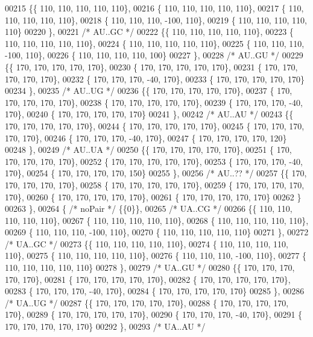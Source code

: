 \begin{DoxyCode}
00215 \{\{ 110, 110, 110, 110, 110\},
00216 \{ 110, 110, 110, 110, 110\},
00217 \{ 110, 110, 110, 110, 110\},
00218 \{ 110, 110, 110, -100, 110\},
00219 \{ 110, 110, 110, 110, 110\}
00220 \},
00221 \textcolor{comment}{/* AU..GC */}
00222 \{\{ 110, 110, 110, 110, 110\},
00223 \{ 110, 110, 110, 110, 110\},
00224 \{ 110, 110, 110, 110, 110\},
00225 \{ 110, 110, 110, -100, 110\},
00226 \{ 110, 110, 110, 110, 100\}
00227 \},
00228 \textcolor{comment}{/* AU..GU */}
00229 \{\{ 170, 170, 170, 170, 170\},
00230 \{ 170, 170, 170, 170, 170\},
00231 \{ 170, 170, 170, 170, 170\},
00232 \{ 170, 170, 170, -40, 170\},
00233 \{ 170, 170, 170, 170, 170\}
00234 \},
00235 \textcolor{comment}{/* AU..UG */}
00236 \{\{ 170, 170, 170, 170, 170\},
00237 \{ 170, 170, 170, 170, 170\},
00238 \{ 170, 170, 170, 170, 170\},
00239 \{ 170, 170, 170, -40, 170\},
00240 \{ 170, 170, 170, 170, 170\}
00241 \},
00242 \textcolor{comment}{/* AU..AU */}
00243 \{\{ 170, 170, 170, 170, 170\},
00244 \{ 170, 170, 170, 170, 170\},
00245 \{ 170, 170, 170, 170, 170\},
00246 \{ 170, 170, 170, -40, 170\},
00247 \{ 170, 170, 170, 170, 120\}
00248 \},
00249 \textcolor{comment}{/* AU..UA */}
00250 \{\{ 170, 170, 170, 170, 170\},
00251 \{ 170, 170, 170, 170, 170\},
00252 \{ 170, 170, 170, 170, 170\},
00253 \{ 170, 170, 170, -40, 170\},
00254 \{ 170, 170, 170, 170, 150\}
00255 \},
00256 \textcolor{comment}{/* AU..?? */}
00257 \{\{ 170, 170, 170, 170, 170\},
00258 \{ 170, 170, 170, 170, 170\},
00259 \{ 170, 170, 170, 170, 170\},
00260 \{ 170, 170, 170, 170, 170\},
00261 \{ 170, 170, 170, 170, 170\}
00262 \}
00263 \},
00264 \{ \textcolor{comment}{/* noPair */} \{\{0\}\},
00265 \textcolor{comment}{/* UA..CG */}
00266 \{\{ 110, 110, 110, 110, 110\},
00267 \{ 110, 110, 110, 110, 110\},
00268 \{ 110, 110, 110, 110, 110\},
00269 \{ 110, 110, 110, -100, 110\},
00270 \{ 110, 110, 110, 110, 110\}
00271 \},
00272 \textcolor{comment}{/* UA..GC */}
00273 \{\{ 110, 110, 110, 110, 110\},
00274 \{ 110, 110, 110, 110, 110\},
00275 \{ 110, 110, 110, 110, 110\},
00276 \{ 110, 110, 110, -100, 110\},
00277 \{ 110, 110, 110, 110, 110\}
00278 \},
00279 \textcolor{comment}{/* UA..GU */}
00280 \{\{ 170, 170, 170, 170, 170\},
00281 \{ 170, 170, 170, 170, 170\},
00282 \{ 170, 170, 170, 170, 170\},
00283 \{ 170, 170, 170, -40, 170\},
00284 \{ 170, 170, 170, 170, 170\}
00285 \},
00286 \textcolor{comment}{/* UA..UG */}
00287 \{\{ 170, 170, 170, 170, 170\},
00288 \{ 170, 170, 170, 170, 170\},
00289 \{ 170, 170, 170, 170, 170\},
00290 \{ 170, 170, 170, -40, 170\},
00291 \{ 170, 170, 170, 170, 170\}
00292 \},
00293 \textcolor{comment}{/* UA..AU */}

\end{DoxyCode}
